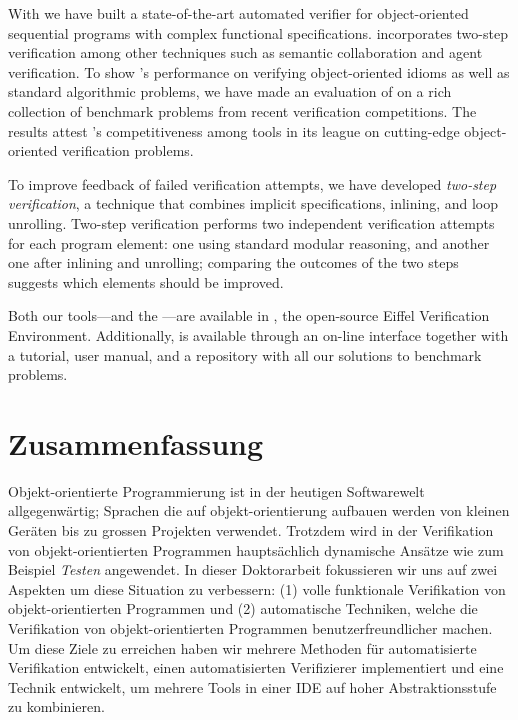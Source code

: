 With \AutoProof we have built a state-of-the-art automated verifier for object-oriented sequential programs with complex functional specifications. \AutoProof incorporates two-step verification among other techniques such as semantic collaboration and agent verification. To show \AutoProof's performance on verifying object-oriented idioms as well as standard algorithmic problems, we have made an evaluation of \AutoProof on a rich collection of benchmark problems from recent verification competitions.
The results attest \AutoProof's competitiveness among tools in its league on cutting-edge object-oriented verification problems.

To improve feedback of failed verification attempts, we have developed \emph{two-step verification}, a technique that combines implicit specifications, inlining, and loop unrolling.
Two-step verification performs two independent verification attempts for each program element: one using standard modular reasoning, and another one after inlining and unrolling; comparing the outcomes of the two steps suggests which elements should be improved.

Both our tools---\AutoProof and the \VAssist---are available in \EVE, the open-source Eiffel Verification Environment. Additionally, \AutoProof is available through an on-line interface together with a tutorial, user manual, and a repository with all our solutions to benchmark problems.



\chapter*{Zusammenfassung}


Objekt-orientierte Programmierung ist in der heutigen Softwarewelt allgegenw\"artig; Sprachen die auf objekt-orientierung aufbauen werden von kleinen Ger\"aten bis zu grossen Projekten verwendet.
Trotzdem wird in der Verifikation von objekt-orientierten Programmen haupts\"achlich dynamische Ans\"atze wie zum Beispiel \emph{Testen} angewendet.
In dieser Doktorarbeit fokussieren wir uns auf zwei Aspekten um diese Situation zu verbessern: (1) volle funktionale Verifikation von objekt-orientierten Programmen und (2) automatische Techniken, welche die Verifikation von objekt-orientierten Programmen benutzerfreundlicher machen.
Um diese Ziele zu erreichen haben wir mehrere Methoden f\"ur automatisierte Verifikation entwickelt, einen automatisierten Verifizierer implementiert und eine Technik entwickelt, um mehrere Tools in einer IDE auf hoher Abstraktionsstufe zu kombinieren.

